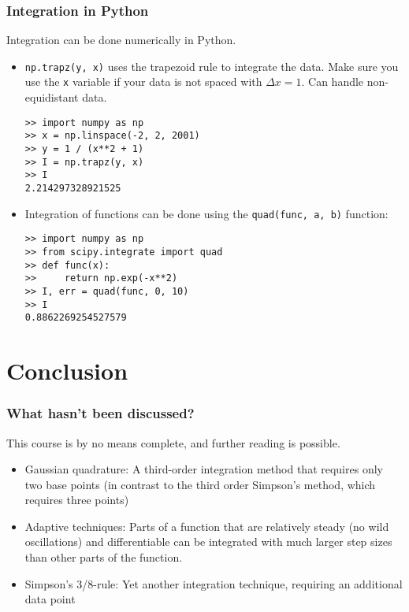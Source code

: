 \begin{frame}[fragile]
  \frametitle{Integration in Python}
  Integration can be done numerically in Python.
  \begin{itemize}
    \item \lstinline$np.trapz(y, x)$ uses the trapezoid rule to integrate the data. Make sure you use the \lstinline$x$ variable if your data is not spaced with $\Delta x=1$. Can handle non-equidistant data.
    \begin{lstlisting}
>> import numpy as np
>> x = np.linspace(-2, 2, 2001)
>> y = 1 / (x**2 + 1)
>> I = np.trapz(y, x)
>> I
2.214297328921525
\end{lstlisting}
    \item Integration of functions can be done using the \lstinline$quad(func, a, b)$ function:
    \begin{lstlisting}
>> import numpy as np
>> from scipy.integrate import quad
>> def func(x):
>>     return np.exp(-x**2)
>> I, err = quad(func, 0, 10)
>> I
0.8862269254527579
\end{lstlisting}
  \end{itemize}
\end{frame}


\section{Conclusion}
\begin{frame}
  \frametitle{What hasn't been discussed?}
  This course is by no means complete, and further reading is possible.
   \begin{itemize}
      \item Gaussian quadrature: A third-order integration method that requires only two base points (in contrast to the third order Simpson's method, which requires three points)
      \item Adaptive techniques: Parts of a function that are relatively steady (no wild oscillations) and differentiable can be integrated with much larger step sizes than other parts of the function.
      \item Simpson's 3/8-rule: Yet another integration technique, requiring an additional data point
   \end{itemize}
\end{frame}

